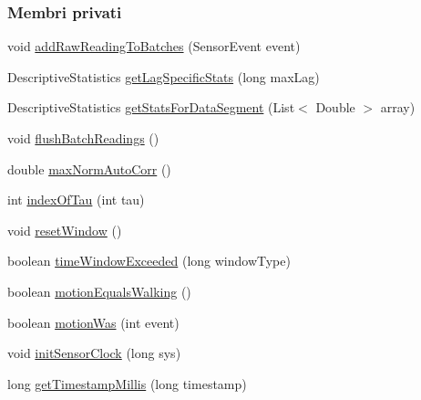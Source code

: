 \subsubsection*{Membri privati}
\begin{DoxyCompactItemize}
\item 
void \hyperlink{classit_1_1unibo_1_1torsello_1_1bluetoothpositioning_1_1util_1_1WalkDetectionUtil_aaa2fda3fa51154aa22c3d6c4385d08eb_aaa2fda3fa51154aa22c3d6c4385d08eb}{add\+Raw\+Reading\+To\+Batches} (Sensor\+Event event)
\item 
Descriptive\+Statistics \hyperlink{classit_1_1unibo_1_1torsello_1_1bluetoothpositioning_1_1util_1_1WalkDetectionUtil_ac4c75fb869a8a9cc6994c8e1e55af955_ac4c75fb869a8a9cc6994c8e1e55af955}{get\+Lag\+Specific\+Stats} (long max\+Lag)
\item 
Descriptive\+Statistics \hyperlink{classit_1_1unibo_1_1torsello_1_1bluetoothpositioning_1_1util_1_1WalkDetectionUtil_a2a153d4d32a5684f7be18d7ee88daacd_a2a153d4d32a5684f7be18d7ee88daacd}{get\+Stats\+For\+Data\+Segment} (List$<$ Double $>$ array)
\item 
void \hyperlink{classit_1_1unibo_1_1torsello_1_1bluetoothpositioning_1_1util_1_1WalkDetectionUtil_aff54c1b481f94da51f43b3e15e0681d1_aff54c1b481f94da51f43b3e15e0681d1}{flush\+Batch\+Readings} ()
\item 
double \hyperlink{classit_1_1unibo_1_1torsello_1_1bluetoothpositioning_1_1util_1_1WalkDetectionUtil_a1145bc9ce4fd56c11ca664eee090b5a1_a1145bc9ce4fd56c11ca664eee090b5a1}{max\+Norm\+Auto\+Corr} ()
\item 
int \hyperlink{classit_1_1unibo_1_1torsello_1_1bluetoothpositioning_1_1util_1_1WalkDetectionUtil_ad619ce1a15adfee0f62b6a1e494cac9d_ad619ce1a15adfee0f62b6a1e494cac9d}{index\+Of\+Tau} (int tau)
\item 
void \hyperlink{classit_1_1unibo_1_1torsello_1_1bluetoothpositioning_1_1util_1_1WalkDetectionUtil_a36be01844dbd58b899b0e0ed90fa9604_a36be01844dbd58b899b0e0ed90fa9604}{reset\+Window} ()
\item 
boolean \hyperlink{classit_1_1unibo_1_1torsello_1_1bluetoothpositioning_1_1util_1_1WalkDetectionUtil_a768731013bc5e301ad9d8d55c43213fd_a768731013bc5e301ad9d8d55c43213fd}{time\+Window\+Exceeded} (long window\+Type)
\item 
boolean \hyperlink{classit_1_1unibo_1_1torsello_1_1bluetoothpositioning_1_1util_1_1WalkDetectionUtil_ab52011f5635c827e80de25d4b18e57bd_ab52011f5635c827e80de25d4b18e57bd}{motion\+Equals\+Walking} ()
\item 
boolean \hyperlink{classit_1_1unibo_1_1torsello_1_1bluetoothpositioning_1_1util_1_1WalkDetectionUtil_af8ca05990e58c5911f943c16ea50e8ae_af8ca05990e58c5911f943c16ea50e8ae}{motion\+Was} (int event)
\item 
void \hyperlink{classit_1_1unibo_1_1torsello_1_1bluetoothpositioning_1_1util_1_1WalkDetectionUtil_a65acb6d1ea859efe8cbee1edafc05bf0_a65acb6d1ea859efe8cbee1edafc05bf0}{init\+Sensor\+Clock} (long sys)
\item 
long \hyperlink{classit_1_1unibo_1_1torsello_1_1bluetoothpositioning_1_1util_1_1WalkDetectionUtil_a746e19bd7811eb09d53b0ba633d0e4d0_a746e19bd7811eb09d53b0ba633d0e4d0}{get\+Timestamp\+Millis} (long timestamp)
\end{DoxyCompactItemize}
